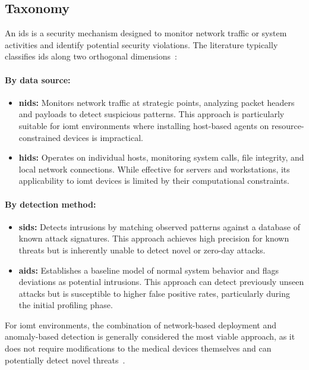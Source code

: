 \subsection{Taxonomy}
\label{subsec:ids-taxonomy}

An \gls{ids} is a security mechanism designed to monitor network traffic or system activities and identify potential security violations. The literature typically classifies \gls{ids} along two orthogonal dimensions~\cite{khraisat2019survey}:

\paragraph{By data source:}
\begin{itemize}
    \item \textbf{\Gls{nids}:} Monitors network traffic at strategic points, analyzing packet headers and payloads to detect suspicious patterns. This approach is particularly suitable for \gls{iomt} environments where installing host-based agents on resource-constrained devices is impractical.

    \item \textbf{\Gls{hids}:} Operates on individual hosts, monitoring system calls, file integrity, and local network connections. While effective for servers and workstations, its applicability to \gls{iomt} devices is limited by their computational constraints.
\end{itemize}

\paragraph{By detection method:}
\begin{itemize}
    \item \textbf{\Gls{sids}:} Detects intrusions by matching observed patterns against a database of known attack signatures. This approach achieves high precision for known threats but is inherently unable to detect novel or zero-day attacks.

    \item \textbf{\Gls{aids}:} Establishes a baseline model of normal system behavior and flags deviations as potential intrusions. This approach can detect previously unseen attacks but is susceptible to higher false positive rates, particularly during the initial profiling phase.
\end{itemize}

For \gls{iomt} environments, the combination of network-based deployment and anomaly-based detection is generally considered the most viable approach, as it does not require modifications to the medical devices themselves and can potentially detect novel threats~\cite{domenech2024ensuring, weber2023attack}.

